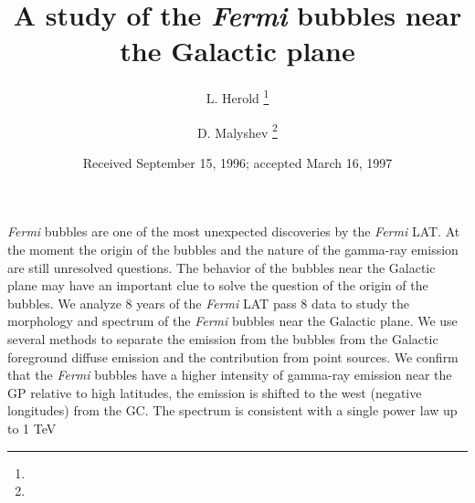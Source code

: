 \documentclass[preprint]{aa}
\newcommand{\Fermi}{\textit{Fermi}\xspace}
\begin{document}
 


   \title{A study of the \Fermi bubbles near the Galactic plane}


   \author{L. Herold \thanks{}
          \and
          D. Malyshev \thanks{}
          }


   \date{Received September 15, 1996; accepted March 16, 1997}

 
  \abstract
   {\Fermi bubbles are one of the most unexpected discoveries by the \Fermi LAT. 
   At the moment the origin of the bubbles and the nature of the gamma-ray emission are still unresolved questions.
   The behavior of the bubbles near the Galactic plane may have an important clue to solve the question of the origin of the bubbles.}
   {We analyze 8 years of the \Fermi LAT pass 8 data to study the morphology and spectrum of the \Fermi bubbles near the Galactic plane.
   }
   {We use several methods to separate the emission from the bubbles from the Galactic foreground diffuse emission and the contribution from
   point sources.}
   {We confirm that the \Fermi bubbles have a higher intensity of gamma-ray emission near the GP relative to high latitudes,
   the emission is shifted to the west (negative longitudes) from the GC. 
   The spectrum is consistent with a single power law up to 1 TeV}
   {}


\maketitle
   
   
\tableofcontents








\newpage
  

\begin{appendix}

\end{appendix}
\end{document}
